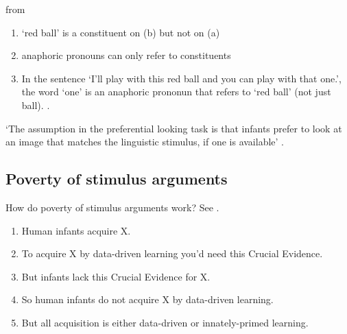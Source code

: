 \documentclass[12pt]{extarticle}
\begin{document}
\begin{multicols}{3}
\begin{center} from \citealp{lidz:2003_what} \end{center}

\begin{enumerate}



\item ‘red ball’ is a constituent on (b) but not on (a)


\item anaphoric pronouns can only refer to constituents



                \item In the sentence ‘I’ll play with this red ball and you can play with that one.’, the word ‘one’ is an anaphoric prononun that refers to ‘red ball’ (not just ball).
                \citep{lidz:2003_what,lidz:2004_reaffirming}.




\end{enumerate}

‘The assumption in the preferential looking task is that infants prefer to look at an image that matches the linguistic stimulus, if one is available’ \citep{lidz:2003_what}.

\subsection{Poverty of stimulus arguments}

How do poverty of stimulus arguments work? See \citet{pullum:2002_empirical}.

\begin{enumerate}

\item

Human infants acquire X.

\item

To acquire X by data-driven learning you'd need this  Crucial Evidence.

\item

But infants lack this Crucial Evidence for X.

\item

So human infants do not acquire X by data-driven learning.

\item

But all acquisition is either data-driven or innately-primed learning.


\end{enumerate}
\end{multicols}
\end{document}
